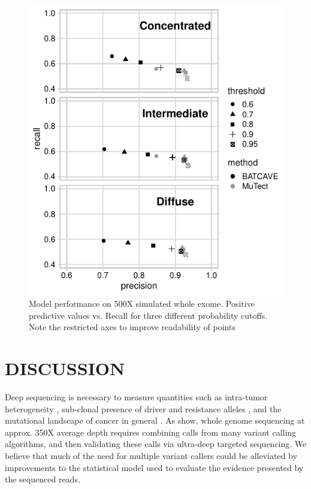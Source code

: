 \documentclass[a4,center,fleqn]{NAR}
\begin{document}
\begin{figure}
  \begin{center}
  \includegraphics{figures/ppv_wes.pdf}
  \end{center}
  \caption{Model performance on 500X simulated whole exome. 
  Positive predictive values vs. Recall for three different probability cutoffs. 
  Note the restricted axes to improve readability of points}
\label{NAR-ppv_fig}
\end{figure}



\section{DISCUSSION}
 
Deep sequencing is necessary to measure quantities such as intra-tumor heterogeneity \cite{Shi2018}, sub-clonal presence of driver and resistance alleles \cite{Griffith2015}, and the mutational landscape of cancer in general \cite{Zehir2017}.  
As \citet{Griffith2015} show, whole genome sequencing at approx. 350X average depth requires combining calls from many variant calling algorithms, and then validating these calls via ultra-deep targeted sequencing. 
We believe that much of the need for multiple variant callers could be alleviated by improvements to the statistical model used to evaluate the evidence presented by the sequenced reads. 
\end{document}
